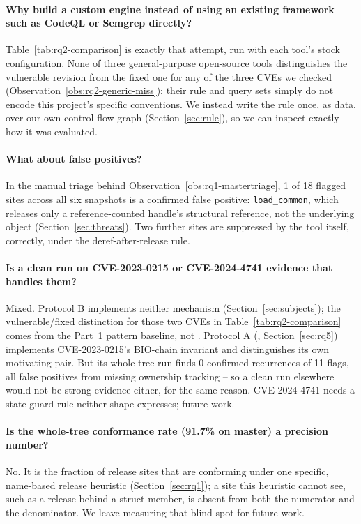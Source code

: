 \paragraph{Why build a custom engine instead of using an existing
framework such as CodeQL or Semgrep directly?} Table~\ref{tab:rq2-comparison}
is exactly that attempt, run with each tool's stock configuration. None
of three general-purpose open-source tools distinguishes the vulnerable
revision from the fixed one for any of the three CVEs we checked
(Observation~\ref{obs:rq2-generic-miss}); their rule and query sets simply
do not encode this project's specific conventions. We instead write the
rule once, as data, over our own control-flow graph
(Section~\ref{sec:rule}), so we can inspect exactly how it was evaluated.

\paragraph{What about false positives?} In the manual triage behind
Observation~\ref{obs:rq1-mastertriage}, 1 of 18 flagged sites across all
six snapshots is a confirmed false positive: \texttt{load\_common}, which
releases only a reference-counted handle's structural reference, not the
underlying object (Section~\ref{sec:threats}). Two further sites are
suppressed by the tool itself, correctly, under the deref-after-release
rule.

\paragraph{Is a clean run on CVE-2023-0215 or CVE-2024-4741 evidence that
\tool handles them?} Mixed. Protocol B implements neither mechanism
(Section~\ref{sec:subjects}); the vulnerable/fixed distinction for those
two CVEs in Table~\ref{tab:rq2-comparison} comes from the Part~1 pattern
baseline, not \tool. Protocol A (, Section~\ref{sec:rq5})
implements CVE-2023-0215's BIO-chain invariant and distinguishes its own
motivating pair. But its whole-tree run finds 0 confirmed recurrences of
11 flags, all false positives from missing ownership tracking -- so a
clean run elsewhere would not be strong evidence either, for the same
reason. CVE-2024-4741 needs a state-guard rule neither shape expresses;
future work.

\paragraph{Is the whole-tree conformance rate (91.7\% on master) a
precision number?} No. It is the fraction of release sites that are
conforming under one specific, name-based release heuristic
(Section~\ref{sec:rq1}); a site this heuristic cannot see, such as a
release behind a struct member, is absent from both the numerator and the
denominator. We leave measuring that blind spot for future work.
